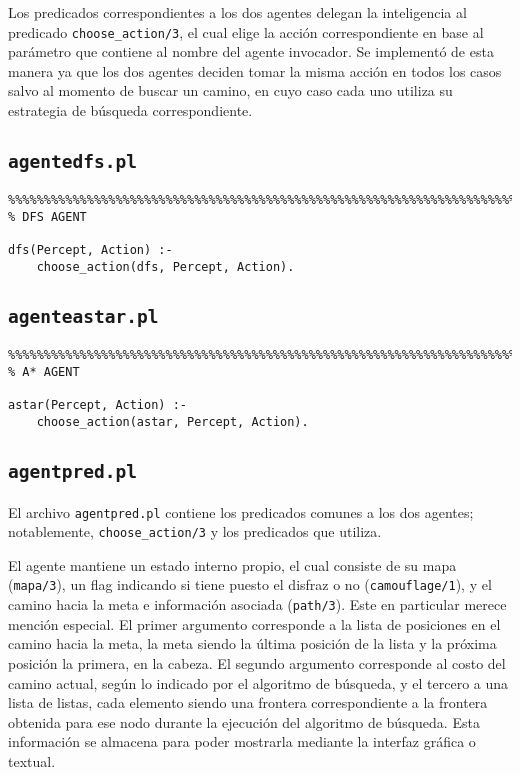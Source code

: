 \documentclass[a4paper,12pt]{report}
\begin{document}
Los predicados correspondientes a los dos agentes delegan la inteligencia al predicado \newline
\texttt{choose\_action/3}, el cual elige la acci\'{o}n correspondiente en base al par\'{a}metro que contiene al nombre
del agente invocador.
Se implement\'{o} de esta manera ya que los dos agentes deciden tomar la misma acci\'{o}n en todos los casos salvo al
momento de buscar un camino, en cuyo caso cada uno utiliza su estrategia de b\'{u}squeda correspondiente.

\subsection{\texttt{agentedfs.pl}}

\begin{verbatim}
%%%%%%%%%%%%%%%%%%%%%%%%%%%%%%%%%%%%%%%%%%%%%%%%%%%%%%%%%%%%%%%%%%%%%%%%%%%%%%%
% DFS AGENT

dfs(Percept, Action) :-
    choose_action(dfs, Percept, Action).

\end{verbatim}

\subsection{\texttt{agenteastar.pl}}

\begin{verbatim}
%%%%%%%%%%%%%%%%%%%%%%%%%%%%%%%%%%%%%%%%%%%%%%%%%%%%%%%%%%%%%%%%%%%%%%%%%%%%%%%
% A* AGENT

astar(Percept, Action) :-
    choose_action(astar, Percept, Action).

\end{verbatim}

\subsection{\texttt{agentpred.pl}}

El archivo \texttt{agentpred.pl} contiene los predicados comunes a los dos agentes; notablemente,
\texttt{choose\_action/3} y los predicados que utiliza.

El agente mantiene un estado interno propio, el cual consiste de su mapa (\texttt{mapa/3}), un flag indicando si tiene
puesto el disfraz o no (\texttt{camouflage/1}), y el camino hacia la meta e informaci\'{o}n asociada (\texttt{path/3}).
Este en particular merece menci\'{o}n especial.
El primer argumento corresponde a la lista de posiciones en el camino hacia la meta, la meta siendo la \'{u}ltima
posici\'{o}n de la lista y la pr\'{o}xima posici\'{o}n la primera, en la cabeza.
El segundo argumento corresponde al costo del camino actual, seg\'{u}n lo indicado por el algoritmo de b\'{u}squeda, y el
tercero a una lista de listas, cada elemento siendo una frontera correspondiente a la frontera obtenida para ese nodo
durante la ejecuci\'{o}n del algoritmo de b\'{u}squeda.
Esta informaci\'{o}n se almacena para poder mostrarla mediante la interfaz gr\'{a}fica o textual.
\end{document}
